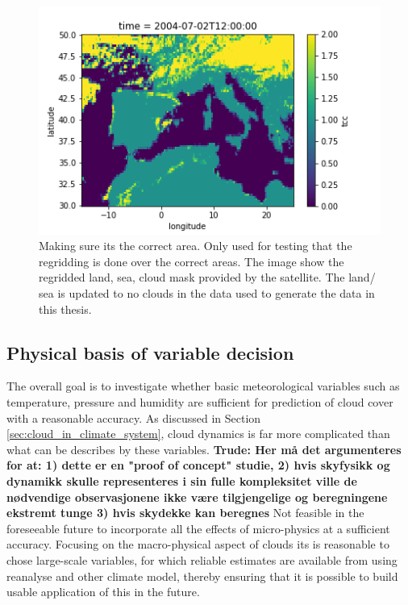 \begin{figure}
    \centering
    \includegraphics{Chapter4_Results/figurs/regridded_raw_satelite_image_to_make_sure_its_correcxt_area.png}
    \caption{Making sure its the correct area. Only used for testing that the regridding is done over the correct areas. The image show the regridded land, sea, cloud mask provided by the satellite. The land/ sea is updated to no clouds in the data used to generate the data in this thesis.}
    \label{fig:correct_area}
\end{figure}

\subsection{Physical basis of variable decision} \label{sec:ecc}
The overall goal is to investigate whether basic meteorological variables such as temperature, pressure and humidity are sufficient for prediction of cloud cover with a reasonable accuracy. As discussed in Section \ref{sec:cloud_in_climate_system}, cloud dynamics is far more complicated than what can be describes by these variables. \textbf{Trude: Her må det argumenteres for at: 1) dette er en "proof of concept" studie, 2) hvis skyfysikk og dynamikk skulle representeres i sin fulle kompleksitet ville de nødvendige observasjonene ikke være tilgjengelige og beregningene ekstremt tunge 3) hvis skydekke kan beregnes }
Not feasible in the foreseeable future to incorporate all the effects of micro-physics at a sufficient accuracy. Focusing on the macro-physical aspect of clouds its is reasonable to chose large-scale variables, for which reliable estimates are available from using reanalyse and other climate model, thereby ensuring that it is possible to build usable application of this in the future.

